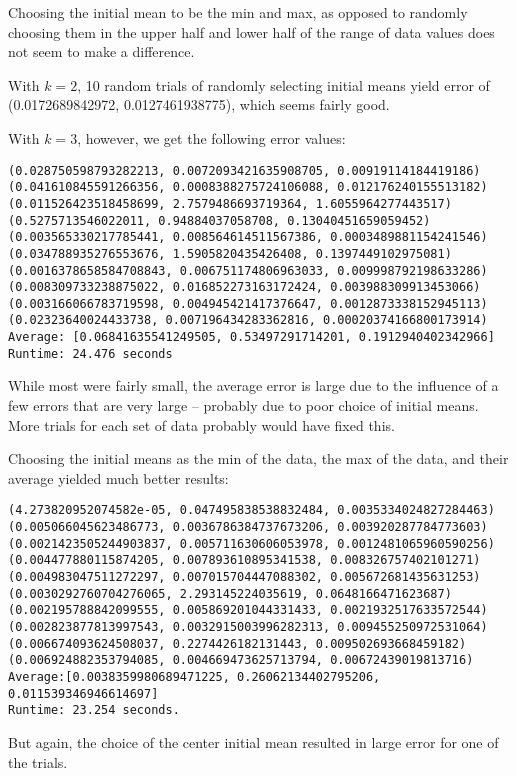 \documentclass[12pt]{article} %
\begin{document}
Choosing the initial mean to be the min and max, as opposed to randomly choosing them in the upper half and lower half of the range of data values does not seem to make a difference.

With $k=2$, 10 random trials of randomly selecting initial means yield error of (0.0172689842972, 0.0127461938775), which seems fairly good.

With $k=3$, however, we get the following error values:
\begin{verbatim}
(0.028750598793282213, 0.0072093421635908705, 0.00919114184419186)
(0.041610845591266356, 0.0008388275724106088, 0.012176240155513182)
(0.011526423518458699, 2.7579486693719364, 1.6055964277443517)
(0.5275713546022011, 0.94884037058708, 0.13040451659059452)
(0.003565330217785441, 0.008564614511567386, 0.0003489881154241546)
(0.034788935276553676, 1.5905820435426408, 0.1397449102975081)
(0.0016378658584708843, 0.006751174806963033, 0.009998792198633286)
(0.008309733238875022, 0.016852273163172424, 0.003988309913453066)
(0.003166066783719598, 0.004945421417376647, 0.0012873338152945113)
(0.02323640024433738, 0.007196434283362816, 0.00020374166800173914)
Average: [0.06841635541249505, 0.53497291714201, 0.1912940402342966]
Runtime: 24.476 seconds
\end{verbatim}

While most were fairly small, the average error is large due to the influence of a few errors that are very large -- probably due to poor choice of initial means. More trials for each set of data probably would have fixed this.

Choosing the initial means as the min of the data, the max of the data, and their average yielded much better results:

\begin{verbatim}
(4.273820952074582e-05, 0.047495838538832484, 0.0035334024827284463)
(0.005066045623486773, 0.0036786384737673206, 0.003920287784773603)
(0.0021423505244903837, 0.005711630606053978, 0.0012481065960590256)
(0.004477880115874205, 0.007893610895341538, 0.008326757402101271)
(0.004983047511272297, 0.007015704447088302, 0.005672681435631253)
(0.0030292760704276065, 2.293145224035619, 0.0648166471623687)
(0.002195788842099555, 0.005869201044331433, 0.0021932517633572544)
(0.002823877813997543, 0.0032915003996282313, 0.009455250972531064)
(0.006674093624508037, 0.2274426182131443, 0.009502693668459182)
(0.006924882353794085, 0.004669473625713794, 0.00672439019813716)
Average:[0.0038359980689471225, 0.26062134402795206, 0.011539346946614697]
Runtime: 23.254 seconds.
\end{verbatim}
But again, the choice of the center initial mean resulted in large error for one of the trials.
\end{document}
